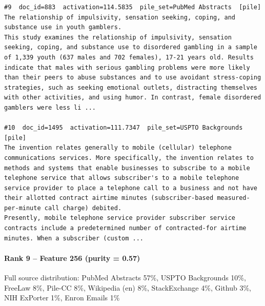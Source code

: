 \begin{verbatim}
#9  doc_id=883  activation=114.5835  pile_set=PubMed Abstracts  [pile]
The relationship of impulsivity, sensation seeking, coping, and substance use in youth gamblers.
This study examines the relationship of impulsivity, sensation seeking, coping, and substance use to disordered gambling in a sample of 1,339 youth (637 males and 702 females), 17-21 years old. Results indicate that males with serious gambling problems were more likely than their peers to abuse substances and to use avoidant stress-coping strategies, such as seeking emotional outlets, distracting themselves with other activities, and using humor. In contrast, female disordered gamblers were less li ...

#10  doc_id=1495  activation=111.7347  pile_set=USPTO Backgrounds  [pile]
The invention relates generally to mobile (cellular) telephone communications services. More specifically, the invention relates to methods and systems that enable businesses to subscribe to a mobile telephone service that allows subscriber's to a mobile telephone service provider to place a telephone call to a business and not have their allotted contract airtime minutes (subscriber-based measured-per-minute call charge) debited.
Presently, mobile telephone service provider subscriber service contracts include a predetermined number of contracted-for airtime minutes. When a subscriber (custom ...

\end{verbatim}

\paragraph*{Rank 9 -- Feature 256 (purity = 0.57)}

Full source distribution: PubMed Abstracts 57\%, USPTO Backgrounds 10\%, FreeLaw 8\%, Pile-CC 8\%, Wikipedia (en) 8\%, StackExchange 4\%, Github 3\%, NIH ExPorter 1\%, Enron Emails 1\%

